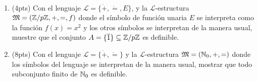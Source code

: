 \begin{prob}
    \
    \begin{enumerate}[label=(\alph*)]
        \item (4pts) Con el lenguaje \(\mathcal{L}=\{\dot+,\dot=,E\}\), y la \(\mathcal{L}\)-estructura \(\mathfrak{{M}}=(\mathbb{Z}/p\mathbb{Z},+,=,f)\) donde el símbolo de función unaria \(E\) se interpreta como la función \(f(x)=x^2\) y los otros símbolos se interpretan de la manera usual, muestre que el conjunto \(A=\{\overline{1}\}\subseteq\mathbb{Z}/p\mathbb{Z}\) es definible.
        \item (8pts) Con el lenguaje \(\mathcal{L}=\{\dot+,\dot=\}\) y la \(\mathcal{L}\)-estructura \(\mathfrak{M}=(\mathbb{N}_0,+,=)\) donde los símbolos del lenguaje se interpretan de la manera usual, mostrar que todo subconjunto finito de \(\mathbb{N}_0\) es definible.
    \end{enumerate}
\end{prob}

